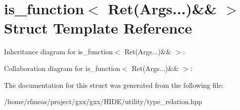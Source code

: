 \hypertarget{structis__function_3_01Ret_07Args_8_8_8_08_6_6_01_4}{}\section{is\+\_\+function$<$ Ret(Args...)\&\& $>$ Struct Template Reference}
\label{structis__function_3_01Ret_07Args_8_8_8_08_6_6_01_4}


Inheritance diagram for is\+\_\+function$<$ Ret(Args...)\&\& $>$\+:


Collaboration diagram for is\+\_\+function$<$ Ret(Args...)\&\& $>$\+:


The documentation for this struct was generated from the following file\+:\begin{DoxyCompactItemize}
\item 
/home/rfmeas/project/gxx/gxx/\+H\+I\+D\+E/utility/type\+\_\+relation.\+hpp\end{DoxyCompactItemize}
